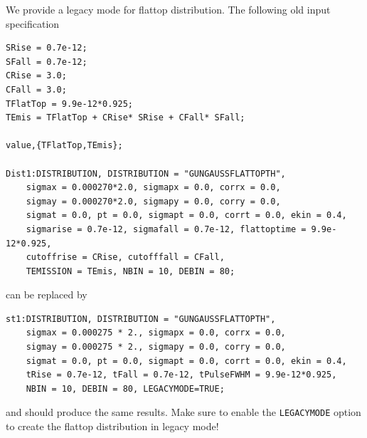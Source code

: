We provide a legacy mode for flattop distribution. The following
old input specification
%
\begin{verbatim}
SRise = 0.7e-12;
SFall = 0.7e-12;
CRise = 3.0;
CFall = 3.0;
TFlatTop = 9.9e-12*0.925;
TEmis = TFlatTop + CRise* SRise + CFall* SFall;

value,{TFlatTop,TEmis};

Dist1:DISTRIBUTION, DISTRIBUTION = "GUNGAUSSFLATTOPTH",
    sigmax = 0.000270*2.0, sigmapx = 0.0, corrx = 0.0,
    sigmay = 0.000270*2.0, sigmapy = 0.0, corry = 0.0,
    sigmat = 0.0, pt = 0.0, sigmapt = 0.0, corrt = 0.0, ekin = 0.4,
    sigmarise = 0.7e-12, sigmafall = 0.7e-12, flattoptime = 9.9e-12*0.925,
    cutoffrise = CRise, cutofffall = CFall,
    TEMISSION = TEmis, NBIN = 10, DEBIN = 80;
\end{verbatim}
%
can be replaced by
%
\begin{verbatim}
st1:DISTRIBUTION, DISTRIBUTION = "GUNGAUSSFLATTOPTH",
    sigmax = 0.000275 * 2., sigmapx = 0.0, corrx = 0.0,
    sigmay = 0.000275 * 2., sigmapy = 0.0, corry = 0.0,
    sigmat = 0.0, pt = 0.0, sigmapt = 0.0, corrt = 0.0, ekin = 0.4,
    tRise = 0.7e-12, tFall = 0.7e-12, tPulseFWHM = 9.9e-12*0.925,
    NBIN = 10, DEBIN = 80, LEGACYMODE=TRUE;
\end{verbatim}
%
and should produce the same results. Make sure to enable the \texttt{LEGACYMODE}
option to create the flattop distribution in legacy mode! 




